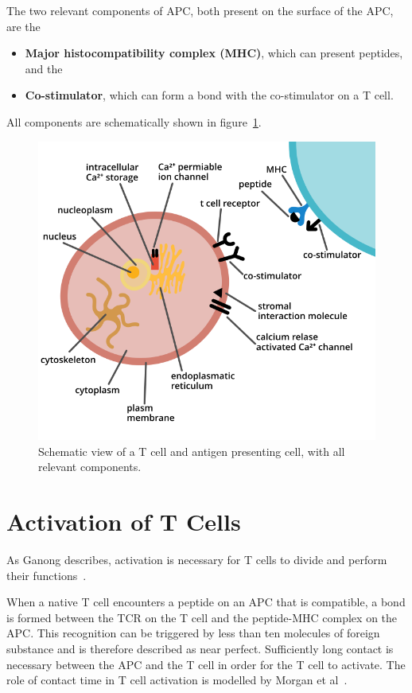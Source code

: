 The two relevant components of APC, both present on the surface of the APC, are the
\begin{itemize}
	\item \textbf{Major histocompatibility complex (MHC)}, which can present peptides, and the
	\item \textbf{Co-stimulator}, which can form a bond with the co-stimulator on a T cell.
\end{itemize}

All components are schematically shown in figure~\ref{fig:tcellcomponents}.

\begin{figure}[h]
	\centering
	\includegraphics[width=0.8\linewidth]{fig/t_cell_components}
	\caption{Schematic view of a T cell and antigen presenting cell, with all relevant components.}
	\label{fig:tcellcomponents}
\end{figure}

\newpage
\section{Activation of T Cells}
\label{sec:t-cell/activation}

As Ganong describes, activation is necessary for T cells to divide and perform their functions~\cite{Ganong1997}.

When a native T cell encounters a peptide on an APC that is compatible, a bond is formed between the TCR on the T cell and the peptide-MHC complex on the APC. This recognition can be triggered by less than ten molecules of foreign substance and is therefore described as near perfect. Sufficiently long contact is necessary between the APC and the T cell in order for the T cell to activate. The role of contact time in T cell activation is modelled by Morgan et al~\cite{morgan2023}.

